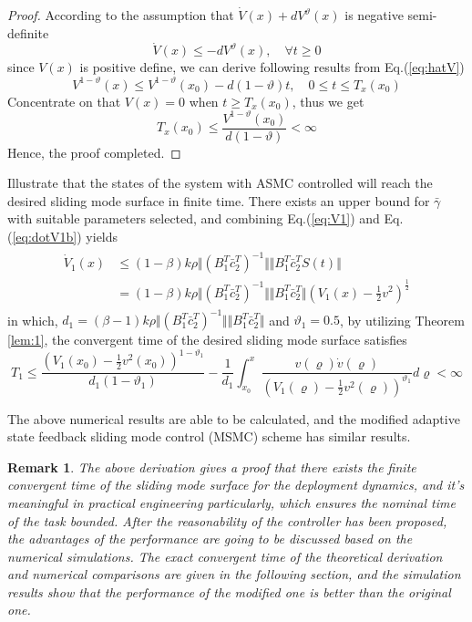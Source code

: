 \documentclass[3p]{elsarticle}
\theoremstyle{plain}
\newtheorem{myrem}{Remark}
\begin{document}
\begin{proof}
According to the assumption that $\dot{V}(x)+dV^{\vartheta}(x)$ is negative semi-definite
\begin{equation}
\dot{V}(x)\le-dV^\vartheta(x), \quad\forall t\ge 0 \label{eq:hatV}
\end{equation}
since $V(x)$ is positive define, we can derive following results from Eq.(\ref{eq:hatV})
\begin{equation*}
V^{1-\vartheta}(x)\le V^{1-\vartheta}(x_0)-d(1-\vartheta)t,\quad 0\le t\le T_x(x_0)
\end{equation*}
Concentrate on that $V(x)=0$ when $t\ge T_x(x_0)$, thus we get
\begin{equation*}
T_x(x_0)\le\frac{V^{1-\vartheta}(x_0)}{d(1-\vartheta)}<\infty
\end{equation*}
Hence, the proof completed.
\end{proof}
Illustrate that the states of the system with ASMC controlled will reach the desired sliding mode surface in finite time. There exists an upper bound for $\bar{\gamma}$ with suitable parameters selected, and combining Eq.(\ref{eq:V1}) and Eq.(\ref{eq:dotV1b}) yields
\begin{align}
\begin{split}
\dot{V}_1(x) &\le (1 -\beta)k\rho\Vert(B_1^T\bar{c}^T_2)^{-1}\Vert \Vert B^T_1\bar{c}_2^TS(t)\Vert\\
&=(1 -\beta)k\rho\Vert(B_1^T\bar{c}^T_2)^{-1}\Vert \Vert B^T_1\bar{c}_2^T\Vert (V_1(x)-\frac{1}{2}v^2)^{\frac{1}{2}}
\end{split}
\end{align}
in which, $d_1 = (\beta-1)k\rho\Vert(B_1^T\bar{c}^T_2)^{-1}\Vert \Vert B^T_1\bar{c}_2^T\Vert$ and $\vartheta_1 = 0.5$, by utilizing Theorem \ref{lem:1}, the convergent time of the desired sliding mode surface satisfies
\begin{equation}
T_1 \le \frac{(V_1(x_0)-\frac{1}{2}v^2(x_0))^{1-\vartheta_1}}{d_1(1-\vartheta_1)}-\frac{1}{d_1}\int_{x_0}^x\frac{v(\varrho)\dot v(\varrho)}{(V_1(\varrho)-\frac{1}{2}v^2(\varrho))^{\vartheta_1}}d\varrho<\infty
\end{equation}\par
The above numerical results are able to be calculated, and the modified adaptive state feedback sliding mode control (MSMC) scheme has similar results.
\begin{myrem}
The above derivation gives a proof that there exists the finite convergent time of the sliding mode surface for the deployment dynamics, and it's meaningful in practical engineering particularly, which ensures the nominal time of the task bounded. After the reasonability of the controller has been proposed, the advantages of the performance are going to be discussed based on the numerical simulations. The exact convergent time of the theoretical derivation and numerical comparisons are given in the following section, and the simulation results show that the performance of the modified one is better than the original one.
\end{myrem}
\end{document}
